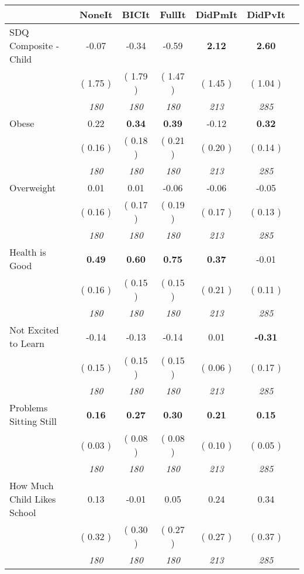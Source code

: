 \begin{tabular}{l c c c c c c}
\toprule
 & NoneIt & BICIt & FullIt & DidPmIt & DidPvIt \\
\midrule
SDQ Composite - Child &     -0.07 &     -0.34 &     -0.59 & \textbf{      2.12 } & \textbf{      2.60 } \\
& (     1.75 ) & (     1.79 ) & (     1.47 ) & (     1.45 ) & (     1.04 ) \\
& \textit{ 180 } & \textit{ 180 } & \textit{ 180 } & \textit{ 213 } & \textit{ 285 } \\
Obese &      0.22 & \textbf{      0.34 } & \textbf{      0.39 } &     -0.12 & \textbf{      0.32 } \\
& (     0.16 ) & (     0.18 ) & (     0.21 ) & (     0.20 ) & (     0.14 ) \\
& \textit{ 180 } & \textit{ 180 } & \textit{ 180 } & \textit{ 213 } & \textit{ 285 } \\
Overweight &      0.01 &      0.01 &     -0.06 &     -0.06 &     -0.05 \\
& (     0.16 ) & (     0.17 ) & (     0.19 ) & (     0.17 ) & (     0.13 ) \\
& \textit{ 180 } & \textit{ 180 } & \textit{ 180 } & \textit{ 213 } & \textit{ 285 } \\
Health is Good & \textbf{      0.49 } & \textbf{      0.60 } & \textbf{      0.75 } & \textbf{      0.37 } &     -0.01 \\
& (     0.16 ) & (     0.15 ) & (     0.15 ) & (     0.21 ) & (     0.11 ) \\
& \textit{ 180 } & \textit{ 180 } & \textit{ 180 } & \textit{ 213 } & \textit{ 285 } \\
Not Excited to Learn &     -0.14 &     -0.13 &     -0.14 &      0.01 & \textbf{     -0.31 } \\
& (     0.15 ) & (     0.15 ) & (     0.15 ) & (     0.06 ) & (     0.17 ) \\
& \textit{ 180 } & \textit{ 180 } & \textit{ 180 } & \textit{ 213 } & \textit{ 285 } \\
Problems Sitting Still & \textbf{      0.16 } & \textbf{      0.27 } & \textbf{      0.30 } & \textbf{      0.21 } & \textbf{      0.15 } \\
& (     0.03 ) & (     0.08 ) & (     0.08 ) & (     0.10 ) & (     0.05 ) \\
& \textit{ 180 } & \textit{ 180 } & \textit{ 180 } & \textit{ 213 } & \textit{ 285 } \\
How Much Child Likes School &      0.13 &     -0.01 &      0.05 &      0.24 &      0.34 \\
& (     0.32 ) & (     0.30 ) & (     0.27 ) & (     0.27 ) & (     0.37 ) \\
& \textit{ 180 } & \textit{ 180 } & \textit{ 180 } & \textit{ 213 } & \textit{ 285 } \\
\bottomrule
\end{tabular}
